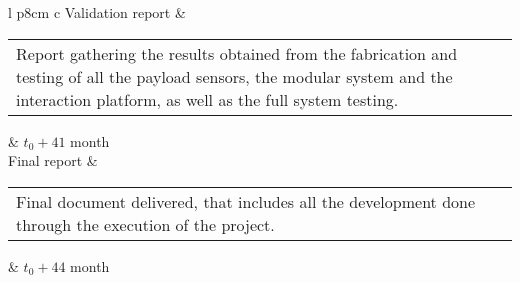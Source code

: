 \begin{longtable}[H]{l p{8cm} c}
	Validation report & \begin{tabular}[c]{@{}l@{}}\begin{minipage}[t]{\linewidth}
			Report gathering the results obtained from the fabrication and testing of all the payload sensors, the modular system and the interaction platform, as well as the full system testing. \vspace{0.3cm}
	\end{minipage} \end{tabular}   & $t_0 +41$ month                                                                                                                                           \\  \hline
	Final report & \begin{tabular}[c]{@{}l@{}}\begin{minipage}[t]{\linewidth}
			Final document delivered, that includes all the development done through the execution of the project. \vspace{0.3cm}
	\end{minipage} \end{tabular}   & $t_0 + 44$ month                                                                                                                                           
	
		\\ \bottomrule[2pt]
	\caption{Project Deliverables}
\end{longtable}


